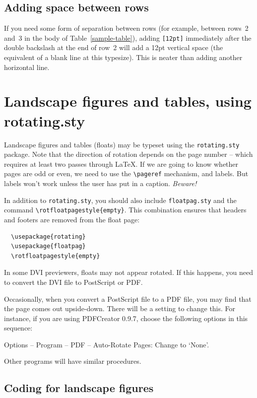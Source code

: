 \subsection{Adding space between rows}
If you need some form of separation between rows (for example, between rows~2 and~3 in the body of Table~\ref{sample-table}), adding \verb"[12pt]" immediately after the double backslash at the end of row~2 will add a 12pt vertical space (the equivalent of a blank line at this typesize). This is neater than adding another horizontal line.


\section{Landscape figures and tables, using rotating.sty}

Landscape figures and tables (floats) may be typeset using the \verb"rotating.sty" package. Note that the direction of rotation depends on the page number -- which requires at least two passes through \LaTeX. If we are going to know whether pages are odd or even, we need to use the \verb"\pageref" mechanism, and labels. But labels won't work unless the user has put in a caption. \textit{Beware!}

In addition to \verb"rotating.sty", you should also include \verb"floatpag.sty" and the command \verb"\rotfloatpagestyle{empty}". This combination ensures that headers and footers are removed from the float page:
\begin{verbatim}
  \usepackage{rotating}
  \usepackage{floatpag}
  \rotfloatpagestyle{empty}
\end{verbatim}
In some DVI previewers, floats may not appear rotated. If this happens, you need to convert the DVI file to PostScript or PDF.

Occasionally, when you convert a PostScript file to a PDF file, you may find that the page comes out upside-down. There will be a setting to change this. For instance, if you are using PDFCreator 0.9.7, choose the following options in this sequence:
\begin{description}
  \item Options -- Program -- PDF -- Auto-Rotate Pages: Change to `None'.
\end{description}
Other programs will have similar procedures.

\subsection{Coding for landscape figures}

